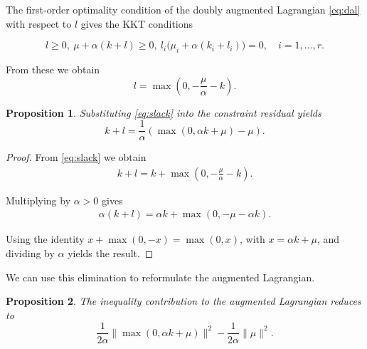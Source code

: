 \documentclass[11pt]{article}
\newtheorem{proposition}{Proposition}
\begin{document}
The first-order optimality condition of the doubly augmented Lagrangian \eqref{eq:dal} with respect to $l$ gives the KKT conditions

\begin{equation}
l \ge 0, ~\mu + \alpha (k+l) \ge 0, ~l_i\bigl(\mu_i+\alpha(k_i+l_i)\bigr)=0,
\quad i=1,\ldots,r.
\label{eq:slack_complementarity}
\end{equation}

From these we obtain
\begin{equation}
l = \max\left( 0, -\frac{\mu}{\alpha}-k \right).
\label{eq:slack}
\end{equation}


\begin{proposition}
\label{prop1}
Substituting \eqref{eq:slack} into the constraint residual yields
\[
k+l
=
\frac1\alpha
\left(
\max(0,\alpha k+\mu)-\mu
\right).
\]

\end{proposition}

\begin{proof}

From \eqref{eq:slack}
we obtain
\begin{align*}
    k+l=k+\max\left(0,-\frac{\mu}{\alpha}-k\right).
\end{align*}

Multiplying by $\alpha>0$ gives
\begin{align*}
\alpha(k+l) = \alpha k + \max(0,-\mu-\alpha k).
\end{align*}

Using the identity
$x+\max(0,-x)=\max(0,x)$,
with $x=\alpha k+\mu$, and dividing by $\alpha$ yields the result.

\end{proof}

We can use this elimination to reformulate the augmented Lagrangian.

\begin{proposition}

The inequality contribution to the augmented Lagrangian reduces to
\begin{equation}
\frac1{2\alpha}
\|
\max(0,\alpha k+\mu)
\|^2
-
\frac1{2\alpha}\|\mu\|^2.
\label{eq:maxterm}
\end{equation}

\end{proposition}
\end{document}
